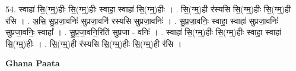 \documentclass[17pt]{extarticle}
\begin{document}
54. स्वाहा॑ सि॒(ग्म्॒)हीः सि॒(ग्म्॒)हीः स्वाहा॒ स्वाहा॑ सि॒(ग्म्॒)हीः । . सि॒(ग्म्॒)ही र॑स्यसि सि॒(ग्म्॒)हीः सि॒(ग्म्॒)ही र॑सि । . अ॒सि॒ सु॒प्र॒जा॒वनिः॑ सुप्रजा॒वनि॑ रस्यसि सुप्रजा॒वनिः॑ । . सु॒प्र॒जा॒वनिः॒ स्वाहा॒ स्वाहा॑ सुप्रजा॒वनिः॑ सुप्रजा॒वनिः॒ स्वाहा᳚ । . सु॒प्र॒जा॒वनि॒रिति॑ सुप्रजा - वनिः॑ । . स्वाहा॑ सि॒(ग्म्॒)हीः सि॒(ग्म्॒)हीः स्वाहा॒ स्वाहा॑ सि॒(ग्म्॒)हीः । . सि॒(ग्म्॒)ही र॑स्यसि सि॒(ग्म्॒)हीः सि॒(ग्म्॒)ही र॑सि । \newline

\textbf{Ghana Paata } \newline
\end{document}

